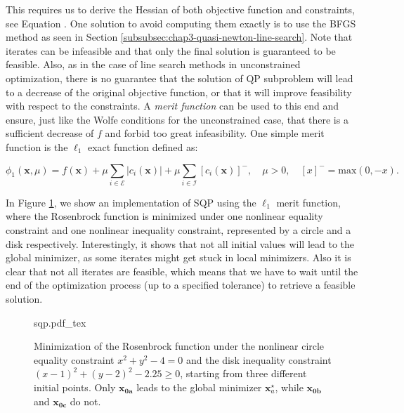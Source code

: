 This requires us to derive the Hessian of both objective function and
constraints, see Equation . One solution to avoid
computing them exactly is to use the BFGS method as seen in Section
\ref{subsubsec:chap3-quasi-newton-line-search}. Note that iterates can
be infeasible and that only the final solution is guaranteed to be
feasible. Also, as in the case of line search methods in unconstrained
optimization, there is no guarantee that the solution of QP subproblem
will lead to a decrease of the original objective function, or that it
will improve feasibility with respect to the constraints. A
\emph{merit function} can be used to this end and ensure, just like
the Wolfe conditions for the unconstrained case, that there is a
sufficient decrease of $f$ \emph{} and forbid too great
infeasibility. One simple merit function is the $\ell_1$ exact
function defined as:

\begin{equation}
  \phi_1(\mathbf{x},\mu)= f(\mathbf{x}) +
  \mu\sum_{i\in\mathcal{E}}|c_i(\mathbf{x})| +
  \mu\sum_{i\in\mathcal{I}}[c_i(\mathbf{x})]^-, \quad\mu>0,
  \quad[x]^-=\text{max}(0,-x).
\end{equation}

In Figure \ref{fig:chap3-sqp}, we show an implementation of SQP using
the $\ell_1$ merit function, where the Rosenbrock function is
minimized under one nonlinear equality constraint and one nonlinear
inequality constraint, represented by a circle and a disk
respectively. Interestingly, it shows that not all initial values will
lead to the global minimizer, as some iterates might get stuck in
local minimizers. Also it is clear that not all iterates are feasible,
which means that we have to wait until the end of the optimization
process (up to a specified tolerance) to retrieve a feasible solution.

\begin{figure}
  \centering
      {\def\svgwidth{0.8\linewidth}
        {\footnotesize
          
                     {sqp.pdf_tex}
        }
      }
      \caption[NLP Solution using SQP methods.]{Minimization of the
        Rosenbrock function under the nonlinear circle equality
        constraint $x^2+y^2-4=0$ and the disk inequality constraint
        $(x-1)^2+(y-2)^2-2.25 \ge 0$, starting from three different
        initial points. Only $\mathbf{x_{0a}}$ leads to the global
        minimizer $\mathbf{x}_a^\star$, while $\mathbf{x_{0b}}$ and
        $\mathbf{x_{0c}}$ do not.}
      \label{fig:chap3-sqp}
\end{figure}

